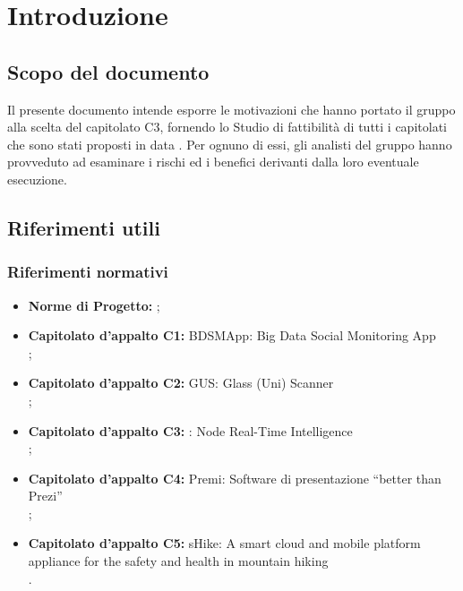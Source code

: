 \section{Introduzione}

	\subsection{Scopo del documento}
		Il presente documento intende esporre le motivazioni che hanno portato il gruppo alla scelta del capitolato C3, fornendo lo Studio di fattibilità di tutti i capitolati che sono stati proposti in data . Per ognuno di essi, gli analisti del gruppo hanno provveduto ad esaminare i rischi ed i benefici derivanti dalla loro eventuale esecuzione.
	
	


	\subsection{Riferimenti utili}

		\subsubsection{Riferimenti normativi}
			\begin{itemize}
				\item \textbf{Norme di Progetto:} ;
				\item \textbf{Capitolato d'appalto C1:} BDSMApp: Big Data Social Monitoring App\\
					;
				\item \textbf{Capitolato d'appalto C2:} GUS: Glass (Uni) Scanner\\
					;
				\item \textbf{Capitolato d'appalto C3:} \projectname: Node Real-Time Intelligence\\
					;
				\item \textbf{Capitolato d'appalto C4:} Premi: Software di presentazione “better than Prezi”\\
					;
				\item \textbf{Capitolato d'appalto C5:} sHike: A smart cloud and mobile platform appliance for the safety and health in mountain hiking\\
					.
			\end{itemize}

